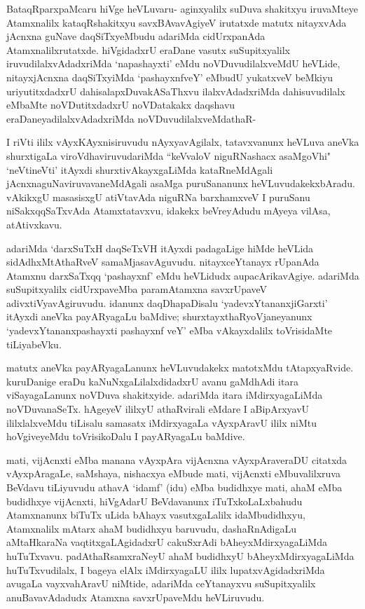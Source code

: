 \begin{artha}
BataqRparxpaMcaru hiVge heVLuvaru- aginxyalilx suDuva shakitxyu iruvaMteye Atamxnalilx kataqRshakitxyu savxBAvavAgiyeV irutatxde matutx nitayxvAda jAcnxna guNave daqSiTxyeMbudu adariMda cidUrxpanAda Atamxnalilxrutatxde. hiVgidadxrU eraDane vasutx suSupitxyalilx iruvudilalxvAdadxriMda `napashayxti' eMdu noVDuvudilalxveMdU heVLide, nitayxjAcnxna daqSiTxyiMda `pashayxnfveY' eMbudU yukatxveV beMkiyu uriyutitxdadxrU dahisalapxDuvakASaThxvu ilalxvAdadxriMda dahisuvudilalx eMbaMte noVDutitxdadxrU noVDatakakx daqshavu eraDaneyadilalxvAdadxriMda noVDuvudilalxveMdathaR-
\end{artha}


\begin{artha}
I riVti ililx vAyxKAyxnisiruvudu nAyxyavAgilalx, tatavxvanunx heVLuva aneVka shurxtigaLa viroVdhaviruvudariMda ``keVvaloV niguRNashacx asaMgoVhi" `neVtineVti' itAyxdi shurxtivAkayxgaLiMda kataRneMdAgali jAcnxnaguNaviruvavaneMdAgali asaMga puruSananunx heVLuvudakekxbAradu. vAkikxgU masasisxgU atiVtavAda niguRNa barxhamxveV I puruSanu niSakxqqSaTxvAda Atamxtatavxvu, idakekx beVreyAdudu mAyeya vilAsa, atAtivxkavu. 
\end{artha}

\begin{artha}
adariMda `darxSuTxH daqSeTxVH itAyxdi padagaLige hiMde heVLida sidAdhxMtAthaRveV samaMjasavAguvudu. nitayxceYtanayx rUpanAda Atamxnu darxSaTxqq `pashayxnf' eMdu heVLidudx aupacArikavAgiye. adariMda suSupitxyalilx cidUrxpaveMba paramAtamxna savxrUpaveV adivxtiVyavAgiruvudu. idanunx daqDhapaDisalu `yadevxYtananxjiGarxti' itAyxdi aneVka payARyagaLu baMdive; shurxtayxthaRyoVjaneyanunx `yadevxYtananxpashayxti pashayxnf veY' eMba vAkayxdalilx toVrisidaMte tiLiyabeVku. 
\end{artha}

\begin{artha}
matutx aneVka payARyagaLanunx heVLuvudakekx matotxMdu tAtapxyaRvide. kuruDanige eraDu kaNuNxgaLilalxdidadxrU avanu gaMdhAdi itara viSayagaLanunx noVDuva shakitxyide. adariMda itara iMdirxyagaLiMda noVDuvanaSeTx. hAgeyeV ililxyU athaRvirali eMdare I aBipArxyavU ililxlalxveMdu tiLisalu samasatx iMdirxyagaLa vAyxpAravU ililx niMtu hoVgiveyeMdu toVrisikoDalu I payARyagaLu baMdive. 
\end{artha}

\begin{artha}
mati, vijAcnxti eMba manana vAyxpAra vijAcnxna vAyxpAraveraDU citatxda vAyxpAragaLe, saMshaya, nishacxya eMbude mati, vijAcnxti eMbuvalilxruva BeVdavu tiLiyuvudu athavA `idamf' (idu) eMba budidhxye mati, ahaM eMba budidhxye vijAcnxti, hiVgAdarU BeVdavanunx iTuTxkoLaLxbahudu Atamxnanunx biTuTx uLida bAhayx vasutxgaLalilx idaMbudidhxyu, Atamxnalilx mAtarx ahaM budidhxyu baruvudu, dashaRnAdigaLu aMtaHkaraNa vaqtitxgaLAgidadxrU cakuSxrAdi bAheyxMdirxyagaLiMda huTuTxvavu. padAthaRsamxraNeyU ahaM budidhxyU bAheyxMdirxyagaLiMda huTuTxvudilalx, I bageya elAlx iMdirxyagaLU ililx lupatxvAgidadxriMda avugaLa vayxvahAravU niMtide, adariMda ceYtanayxvu suSupitxyalilx anuBavavAdadudx Atamxna savxrUpaveMdu heVLiruvudu.
\end{artha}%

